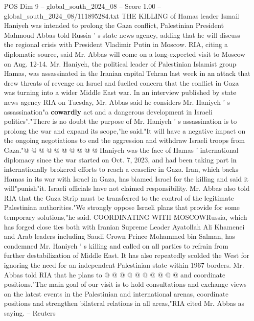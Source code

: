 \begin{textsample}{POS Dim 9 – global\_south\_2024\_08 – Score 1.00 – global\_south\_2024\_08/111895284.txt}  \label{ex:f9_pos_120}
THE KILLING of Hamas leader Ismail Haniyeh was intended to prolong the Gaza conflict, Palestinian President Mahmoud Abbas told Russia ' s state news agency, adding that he will discuss the regional crisis with President Vladimir Putin in Moscow.
RIA, citing a diplomatic source, said Mr.
Abbas will come on a long-expected visit to Moscow on Aug. 12-14.
Mr.
Haniyeh, the political leader of Palestinian Islamist group Hamas, was assassinated in the Iranian capital Tehran last week in an attack that drew threats of revenge on Israel and fuelled concern that the conflict in Gaza was turning into a wider Middle East war.
In an interview published by state news agency RIA on Tuesday, Mr.
Abbas said he considers Mr.
Haniyeh ' s assassination"a \textbf{cowardly} act and a dangerous development in Israeli politics"."There is no doubt the purpose of Mr.
Haniyeh ' s assassination is to prolong the war and expand its scope,"he said."It will have a negative impact on the ongoing negotiations to end the aggression and withdraw Israeli troops from Gaza."@ @ @ @ @ @ @ @ @ @ Haniyeh was the face of Hamas ' international diplomacy since the war started on Oct. 7, 2023, and had been taking part in internationally brokered efforts to reach a ceasefire in Gaza.
Iran, which backs Hamas in its war with Israel in Gaza, has blamed Israel for the killing and said it will"punish"it.
Israeli officials have not claimed responsibility.
Mr.
Abbas also told RIA that the Gaza Strip must be transferred to the control of the legitimate Palestinian authorities."We strongly oppose Israeli plans that provide for some temporary solutions,"he said.
COORDINATING WITH MOSCOWRussia, which has forged close ties both with Iranian Supreme Leader Ayatollah Ali Khamenei and Arab leaders including Saudi Crown Prince Mohammed bin Salman, has condemned Mr.
Haniyeh ' s killing and called on all parties to refrain from further destabilization of Middle East.
It has also repeatedly scolded the West for ignoring the need for an independent Palestinian state within 1967 borders.
Mr.
Abbas told RIA that he plans to @ @ @ @ @ @ @ @ @ @ and coordinate positions."The main goal of our visit is to hold consultations and exchange views on the latest events in the Palestinian and international arenas, coordinate positions and strengthen bilateral relations in all areas,"RIA cited Mr.
Abbas as saying. -- Reuters

\end{textsample}
